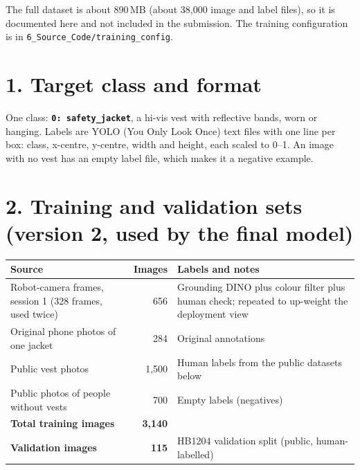 \documentclass[10.5pt]{article}
\begin{document}

The full dataset is about 890\,MB (about 38,000 image and label files), so it is documented here and not included in the submission. The training configuration is in \texttt{6\_Source\_Code/training\_config}.

\section{1. Target class and format}
One class: \textbf{\texttt{0: safety\_jacket}}, a hi-vis vest with reflective bands, worn or hanging. Labels are YOLO (You Only Look Once) text files with one line per box: class, x-centre, y-centre, width and height, each scaled to 0--1. An image with no vest has an empty label file, which makes it a negative example.

\section{2. Training and validation sets (version 2, used by the final model)}
\begin{tabularx}{\linewidth}{>{\raggedright\arraybackslash}X r >{\raggedright\arraybackslash}p{7.2cm}}
\toprule
\textbf{Source} & \textbf{Images} & \textbf{Labels and notes} \\
\midrule
Robot-camera frames, session 1 (328 frames, used twice) & 656 & Grounding DINO plus colour filter plus human check; repeated to up-weight the deployment view \\
Original phone photos of one jacket & 284 & Original annotations \\
Public vest photos & 1,500 & Human labels from the public datasets below \\
Public photos of people without vests & 700 & Empty labels (negatives) \\
\midrule
\textbf{Total training images} & \textbf{3,140} & \\
\textbf{Validation images} & \textbf{115} & HB1204 validation split (public, human-labelled) \\
\bottomrule
\end{tabularx}
\end{document}
